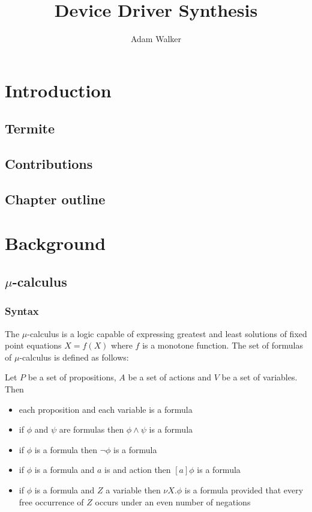 \documentclass{book}
\title{Device Driver Synthesis}
\author{Adam Walker}
\theoremstyle{definition}
\begin{document}
\maketitle
\tableofcontents

\chapter{Introduction}

\section{Termite}
\section{Contributions}
\section{Chapter outline}

\chapter{Background}

\section{$\mu$-calculus}

\subsection{Syntax}

The $\mu$-calculus is a logic capable of expressing greatest and least solutions of fixed point equations $X = f(X)$ where $f$ is a monotone function. The set of formulas of $\mu$-calculus is defined as follows:

Let $P$ be a set of propositions, $A$ be a set of actions and $V$ be a set of variables. Then
\begin{itemize}
    \item each proposition and each variable is a formula
    \item if $\phi$ and $\psi$ are formulas then $\phi \wedge \psi$ is a formula
    \item if $\phi$ is a formula then $\neg \phi$ is a formula
    \item if $\phi$ is a formula and $a$ is and action then $[a]\phi$ is a formula
    \item if $\phi$ is a formula and $Z$ a variable then $\nu X.\phi$ is a formula provided that every free occurrence of $Z$ occurs under an even number of negations
\end{itemize}
\end{document}
